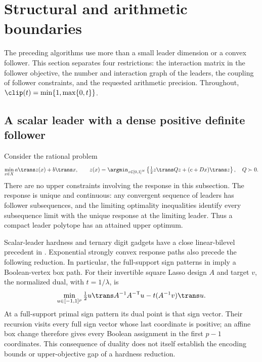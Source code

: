 \section{Structural and arithmetic boundaries}\label{sec:boundaries}
The preceding algorithms use more than a small leader dimension or a convex
follower. This section separates four restrictions: the interaction matrix in
the follower objective, the number and interaction graph of the leaders, the
coupling of follower constraints, and the requested arithmetic precision.
Throughout, \(\clip(t)=\min\{1,\max\{0,t\}\}\).

\subsection{A scalar leader with a dense positive definite follower}
\label{subsec:dense-hardness}
Consider the rational problem
\begin{equation}\label{eq:dense-box-model}
 \min_{x\in X} a\trans z(x)+b\trans x,\qquad
 z(x)=\argmin_{z\in[0,1]^N}
 \left\{\tfrac12z\trans Qz+(c+Dx)\trans z\right\},\quad Q\succ0.
\end{equation}
There are no upper constraints involving the response in this subsection.
The response is unique and continuous: any convergent sequence of leaders has
follower subsequences, and the limiting optimality inequalities identify every
subsequence limit with the unique response at the limiting leader. Thus a
compact leader polytope has an attained upper optimum.

Scalar-leader hardness and ternary digit gadgets have a close linear-bilevel
precedent in \citet[Theorem~2.1 and Section~4]{SugishitaCarvalho2026}. Exponential
strongly convex response paths also precede the following reduction.
In particular, the full-support sign patterns in
\citet[Proposition~2, equation~(4)]{MairalYu2012} imply a Boolean-vertex box path.
For their invertible square Lasso design \(A\) and target \(v\), the normalized
dual, with \(t=1/\lambda\), is
\[
 \min_{u\in[-1,1]^p}\tfrac12u\trans A^{-1}A^{-\mathsf T}u
       -t(A^{-1}v)\trans u.
\]
At a full-support primal sign pattern its dual point is that sign vector.
Their recursion visits every full sign vector whose last coordinate is positive;
an affine box change therefore gives every Boolean assignment in the first
\(p-1\) coordinates. This consequence of duality does not itself establish the
encoding bounds or upper-objective gap of a hardness reduction.


